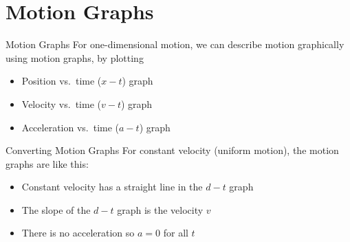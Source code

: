 \documentclass[12pt,compress,aspectratio=169]{beamer}
\begin{document}
\section{Motion Graphs}

\begin{frame}{Motion Graphs}
  For one-dimensional motion, we can describe motion graphically using motion
  graphs, by plotting
  \begin{itemize}
  \item Position vs.\ time ($x-t$) graph
  \item Velocity vs.\ time ($v-t$) graph
  \item Acceleration vs.\ time ($a-t$) graph
  \end{itemize}
\end{frame}


\begin{frame}{Converting Motion Graphs}
  For constant velocity (uniform motion), the motion graphs are like this:

  \vspace{-.1in}
  \begin{center}
    \hspace{.15in}
    \hspace{.15in}
  \end{center}

  \begin{itemize}
  \item Constant velocity has a straight line in the $d-t$ graph
  \item The slope of the $d-t$ graph is the velocity $v$ %
  \item There is no acceleration so $a=0$ for all $t$
  \end{itemize}
\end{frame}
\end{document}
